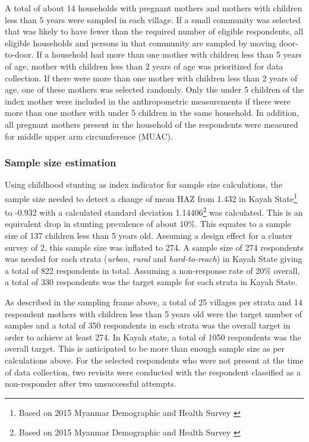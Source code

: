\documentclass[12pt,a4paper]{article}
\let\rmarkdownfootnote\footnote%
\def\footnote{\protect\rmarkdownfootnote}
\begin{document}
A total of about 14 households with pregnant mothers and mothers with children less than 5 years were sampled in each village. If a small community was selected that was likely to have fewer than the required number of eligible respondents, all eligible households and persons in that community are sampled by moving door-to-door. If a household had more than one mother with children less than 5 years of age, mother with children less than 2 years of age was prioritized for data collection. If there were more than one mother with children less than 2 years of age, one of these mothers was selected randomly. Only the under 5 children of the index mother were included in the anthropometric measurements if there were more than one mother with under 5 children in the same household. In addition, all pregnant mothers present in the household of the respondents were measured for middle upper arm circumference (MUAC).

\hypertarget{sample-size-estimation}{%
\subsubsection{Sample size estimation}\label{sample-size-estimation}}

Using childhood stunting as index indicator for sample size calculations, the sample size needed to detect a change of mean HAZ from 1.432 in Kayah State\footnote{Based on 2015 Myanmar Demographic and Health Survey \citep{MinistryofHealthandSports-MoHS/Myanmar2017}} to -0.932 with a calculated standard deviation 1.14406\footnote{Based on 2015 Myanmar Demographic and Health Survey \citep{MinistryofHealthandSports-MoHS/Myanmar2017}} was calculated. This is an equivalent drop in stunting prevalence of about 10\%. This equates to a sample size of 137 children less than 5 years old. Assuming a design effect for a cluster survey of 2, this sample size was inflated to 274. A sample size of 274 respondents was needed for each strata (\emph{urban}, \emph{rural} and \emph{hard-to-reach}) in Kayah State giving a total of 822 respondents in total. Assuming a non-response rate of 20\% overall, a total of 330 respondents was the target sample for each strata in Kayah State.

As described in the sampling frame above, a total of 25 villages per strata and 14 respondent mothers with children less than 5 years old were the target number of samples and a total of 350 respondents in each strata was the overall target in order to achieve at least 274. In Kayah state, a total of 1050 respondents was the overall target. This is anticipated to be more than enough sample size as per calculations above. For the selected respondents who were not present at the time of data collection, two revisits were conducted with the respondent classified as a non-responder after two unsuccessful attempts.
\end{document}
